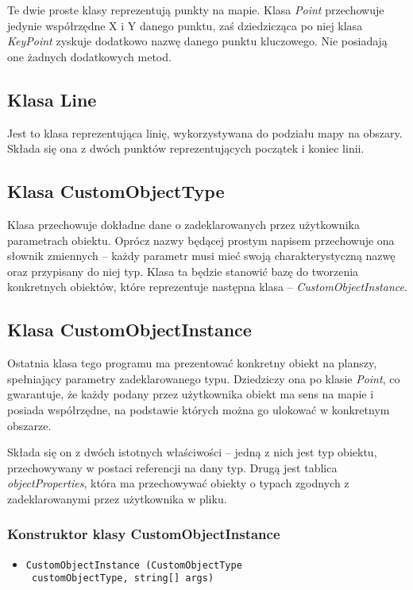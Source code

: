 \documentclass[a4paper,11pt]{article}
\newcommand\tab[1][0.6cm]{\hspace*{#1}}
\begin{document}
\tab Te dwie proste klasy reprezentują punkty na mapie. Klasa \textit{Point} przechowuje jedynie współrzędne X i Y danego punktu, zaś dziedzicząca po niej klasa \textit{KeyPoint} zyskuje dodatkowo nazwę danego punktu kluczowego. Nie posiadają one żadnych dodatkowych metod.

\subsection{Klasa Line}

\tab Jest to klasa reprezentująca linię, wykorzystywana do podziału mapy na obszary. Składa się ona z dwóch punktów reprezentujących początek i koniec linii.

\subsection{Klasa CustomObjectType}

\tab Klasa przechowuje dokładne dane o zadeklarowanych przez użytkownika parametrach obiektu. Oprócz nazwy będącej prostym napisem przechowuje ona słownik zmiennych -- każdy parametr musi mieć swoją charakterystyczną nazwę oraz przypisany do niej typ. Klasa ta będzie stanowić bazę do tworzenia konkretnych obiektów, które reprezentuje następna klasa -- \textit{CustomObjectInstance}.

\subsection{Klasa CustomObjectInstance}

\tab Ostatnia klasa tego programu ma prezentować konkretny obiekt na planszy, spełniający parametry zadeklarowanego typu. Dziedziczy ona po klasie \textit{Point}, co gwarantuje, że każdy podany przez użytkownika obiekt ma sens na mapie i posiada współrzędne, na podstawie których można go ulokować w konkretnym obszarze.

Składa się on z dwóch istotnych właściwości -- jedną z nich jest typ obiektu, przechowywany w postaci referencji na dany typ. Drugą jest tablica \textit{objectProperties}, która ma przechowywać obiekty o typach zgodnych z zadeklarowanymi przez użytkownika w pliku. 

\subsubsection{Konstruktor klasy CustomObjectInstance}

\begin{itemize}
\item \begin{lstlisting}
CustomObjectInstance (CustomObjectType
 customObjectType, string[] args)
\end{lstlisting}
\end{itemize}
\end{document}
